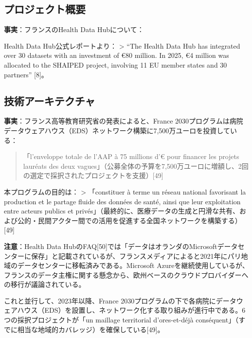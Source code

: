 \documentclass[
  a4paper,
  a4paper,
  11pt]{ltjsbook}
\begin{document}
\subsection{プロジェクト概要}\label{ux30d7ux30edux30b8ux30a7ux30afux30c8ux6982ux8981}

\textbf{事実}：フランスのHealth Data Hubについて：

Health Data Hub公式レポートより： \textgreater{} ``The Health Data Hub
has integrated over 30 datasets with an investment of €80 million. In
2025, €4 million was allocated to the SHAIPED project, involving 11 EU
member states and 30 partners'' {[}8{]}。

\subsection{技術アーキテクチャ}\label{ux6280ux8853ux30a2ux30fcux30adux30c6ux30afux30c1ux30e3-1}

\textbf{事実}：フランス高等教育研究省の発表によると、France
2030プログラムは病院データウェアハウス（EDS）ネットワーク構築に7,500万ユーロを投資している：

\begin{quote}
「l'enveloppe totale de l'AAP à 75 millions d'€ pour financer les
projets lauréats des deux
vagues」（公募全体の予算を7,500万ユーロに増額し、2回の選定で採択されたプロジェクトを支援）{[}49{]}
\end{quote}

本プログラムの目的は： \textgreater{} 「constituer à terme un réseau
national favorisant la production et le partage fluide des données de
santé, ainsi que leur exploitation entre acteurs publics et
privés」（最終的に、医療データの生成と円滑な共有、および公的・民間アクター間での活用を促進する全国ネットワークを構築する）{[}49{]}

\begin{tcolorbox}[enhanced jigsaw, toprule=.15mm, bottomtitle=1mm, coltitle=black, left=2mm, opacityback=0, arc=.35mm, colbacktitle=quarto-callout-warning-color!10!white, colback=white, opacitybacktitle=0.6, bottomrule=.15mm, rightrule=.15mm, breakable, title=\textcolor{quarto-callout-warning-color}{\faExclamationTriangle}\hspace{0.5em}{Warning}, toptitle=1mm, titlerule=0mm, colframe=quarto-callout-warning-color-frame, leftrule=.75mm]

\textbf{注意}：Health Data
HubのFAQ{[}50{]}では「データはオランダのMicrosoftデータセンターに保存」と記載されているが、フランスメディアによると2021年にパリ地域のデータセンターに移転済みである。Microsoft
Azureを継続使用しているが、フランスのデータ主権に関する懸念から、欧州ベースのクラウドプロバイダーへの移行が議論されている。

これと並行して、2023年以降、France
2030プログラムの下で各病院にデータウェアハウス（EDS）を設置し、ネットワーク化する取り組みが進行中である。6つの採択プロジェクトが「un
maillage territorial d'ores-et-déjà
conséquent」（すでに相当な地域的カバレッジ）を確保している{[}49{]}。

\end{tcolorbox}
\end{document}
